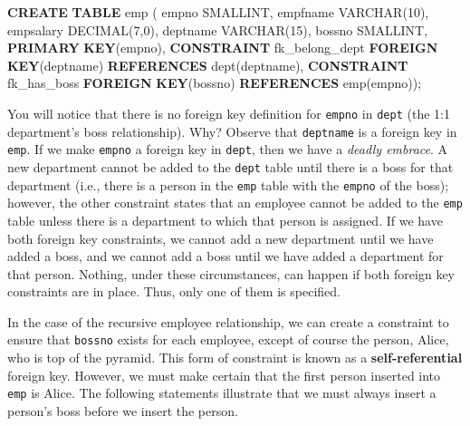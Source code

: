 \documentclass[
]{article}
\newenvironment{Shaded}{\begin{snugshade}}{\end{snugshade}}
\newcommand{\DataTypeTok}[1]{\textcolor[rgb]{0.13,0.29,0.53}{#1}}
\newcommand{\DecValTok}[1]{\textcolor[rgb]{0.00,0.00,0.81}{#1}}
\newcommand{\KeywordTok}[1]{\textcolor[rgb]{0.13,0.29,0.53}{\textbf{#1}}}
\newcommand{\NormalTok}[1]{#1}
\begin{document}
\begin{Shaded}
\begin{Highlighting}[]
\KeywordTok{CREATE} \KeywordTok{TABLE}\NormalTok{ emp (}
\NormalTok{    empno           }\DataTypeTok{SMALLINT}\NormalTok{,}
\NormalTok{    empfname        }\DataTypeTok{VARCHAR}\NormalTok{(}\DecValTok{10}\NormalTok{),}
\NormalTok{    empsalary       }\DataTypeTok{DECIMAL}\NormalTok{(}\DecValTok{7}\NormalTok{,}\DecValTok{0}\NormalTok{),}
\NormalTok{    deptname        }\DataTypeTok{VARCHAR}\NormalTok{(}\DecValTok{15}\NormalTok{),}
\NormalTok{    bossno          }\DataTypeTok{SMALLINT}\NormalTok{,}
    \KeywordTok{PRIMARY} \KeywordTok{KEY}\NormalTok{(empno),}
    \KeywordTok{CONSTRAINT}\NormalTok{ fk\_belong\_dept }\KeywordTok{FOREIGN} \KeywordTok{KEY}\NormalTok{(deptname) }
        \KeywordTok{REFERENCES}\NormalTok{ dept(deptname),}
    \KeywordTok{CONSTRAINT}\NormalTok{ fk\_has\_boss }\KeywordTok{FOREIGN} \KeywordTok{KEY}\NormalTok{(bossno) }
        \KeywordTok{REFERENCES}\NormalTok{ emp(empno));}
\end{Highlighting}
\end{Shaded}

You will notice that there is no foreign key definition for \texttt{empno} in
\texttt{dept} (the 1:1 department's boss relationship). Why? Observe that
\texttt{deptname} is a foreign key in \texttt{emp}. If we make \texttt{empno} a foreign key
in \texttt{dept}, then we have a \emph{deadly embrace}. A new department cannot be
added to the \texttt{dept} table until there is a boss for that department
(i.e., there is a person in the \texttt{emp} table with the \texttt{empno} of the
boss); however, the other constraint states that an employee cannot be
added to the \texttt{emp} table unless there is a department to which that
person is assigned. If we have both foreign key constraints, we cannot
add a new department until we have added a boss, and we cannot add a
boss until we have added a department for that person. Nothing, under
these circumstances, can happen if both foreign key constraints are in
place. Thus, only one of them is specified.

In the case of the recursive employee relationship, we can create a
constraint to ensure that \texttt{bossno} exists for each employee, except of
course the person, Alice, who is top of the pyramid. This form of
constraint is known as a \textbf{self-referential} foreign key. However, we
must make certain that the first person inserted into \texttt{emp} is Alice.
The following statements illustrate that we must always insert a
person's boss before we insert the person.
\end{document}
